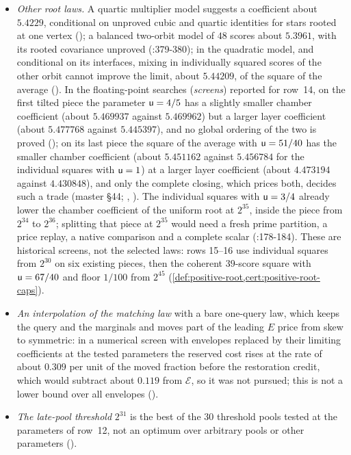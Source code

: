 \begin{itemize}
 law of $48$ scores whose cross-score covariance is unproved.
\item \emph{Other root laws.} A quartic multiplier model suggests a coefficient
 about $5.4229$, conditional on unproved cubic and quartic identities for stars rooted at one vertex
 (); a balanced
 two-orbit model of $48$ scores about $5.3961$, with its rooted covariance
 unproved (:379-380); in the
 quadratic model, and conditional on its interfaces, mixing in individually
 squared scores of the other orbit cannot improve the limit, about $5.44209$, of
 the square of the average
 (). In the floating-point searches (\emph{screens}) reported for row~14, on the
 first tilted piece the parameter $\mathsf u=4/5$ has a slightly smaller chamber
 coefficient (about $5.469937$ against $5.469962$) but a larger layer coefficient
 (about $5.477768$ against $5.445397$), and no global ordering of the two is
 proved ();
 on its last piece the square of the average with $\mathsf u=51/40$ has the smaller
 chamber coefficient (about $5.451162$ against $5.456784$ for the individual
 squares with $\mathsf u=1$) at a larger layer coefficient (about $4.473194$ against
 $4.430848$), and only the complete closing, which prices both, decides such a
 trade (master \S44;
 ,
 ). The
 individual squares with $\mathsf u=3/4$ already lower the chamber coefficient of the
 uniform root at $2^{35}$, inside the piece from $2^{34}$ to $2^{36}$; splitting
 that piece at $2^{35}$ would need a fresh prime partition, a price replay, a
 native comparison and a complete scalar
 (:178-184). These are historical
 screens, not the selected laws: rows 15--16 use individual squares from
 $2^{30}$ on six existing pieces, then the coherent $39$-score square with
 $\mathsf u=67/40$ and floor $1/100$ from $2^{45}$
 (\cref{def:positive-root,cert:positive-root-caps}).
\item \emph{An interpolation of the matching law} with a bare one-query law, which
 keeps the query and the marginals and moves part of the leading $E$ price from
 skew to symmetric: in a numerical screen with envelopes replaced by their limiting coefficients at the tested parameters the reserved cost rises at the rate of about $0.309$ per unit of the
 moved fraction before the restoration credit, which would subtract about $0.119$ from $\mathcal E$, so it was
 not pursued; this is not a lower bound over all envelopes
 ().
\item \emph{The late-pool threshold} $2^{31}$ is the best of the $30$ threshold
 pools tested at the parameters of row~12, not an optimum over arbitrary pools or
 other parameters
 ().
\end{itemize}

